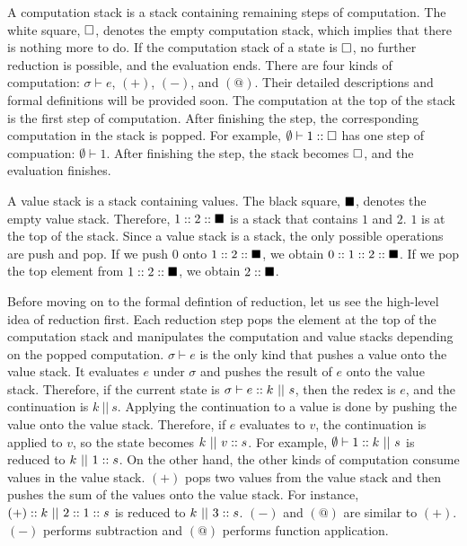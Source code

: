 A computation stack is a stack containing remaining steps of computation.
The white square, $\square$, denotes the empty computation stack, which
implies that there is nothing more to do. If the computation stack of a state is
$\square$, no further reduction is possible, and the evaluation ends.
There are four kinds of computation: $\sigma\vdash e$, $(+)$, $(-)$, and $(@)$.
Their detailed descriptions and formal definitions will be provided soon.
The computation at the top of the stack is the first step of computation. After
finishing the step, the corresponding computation in the stack is popped.
For example, $\emptyset\vdash1::\square$ has one step of compuation:
$\emptyset\vdash1$. After finishing the step, the stack becomes $\square$, and the
evaluation finishes.

A value stack is a stack containing values. The black square, $\blacksquare$, denotes the empty
value stack. Therefore, $1::2::\blacksquare$ is a stack that contains $1$
and $2$. $1$ is at the top of the stack. Since a value stack is a stack, the
only possible operations are push and pop. If we push $0$ onto
$1::2::\blacksquare$, we obtain $0::1::2::\blacksquare$.
If we pop the top element from $1::2::\blacksquare$, we obtain
$2::\blacksquare$.

Before moving on to the formal defintion of reduction, let us see the high-level
idea of reduction first.
Each reduction step pops the element at the top of the computation stack and
manipulates the computation and value stacks depending on the popped computation.
$\sigma\vdash e$ is the only kind that pushes a value onto the value stack.
It evaluates $e$ under $\sigma$ and pushes the result of $e$ onto the value stack.
Therefore, if the current state is $\sigma\vdash e::k\ ||\ s$, then the redex
is $e$, and the continuation is $k\ ||\ s$. Applying the continuation to a value is done by
pushing the value onto the value stack. Therefore, if $e$ evaluates to $v$, the
continuation is applied to $v$, so the state becomes $k\ ||\ \conss{v}s$.
For example, $\emptyset\vdash1::k\ ||\ s$ is reduced to $k\ ||\ 1::s$.
On the other hand, the other kinds of computation consume values in the value stack.
$(+)$ pops two values from the
value stack and then pushes the sum of the values onto the value stack.
For instance, $(+):: k\ ||\ 2::1::s$ is reduced to $k\ ||\ 3::s$.
$(-)$ and $(@)$ are similar to $(+)$. $(-)$ performs subtraction and $(@)$
performs function application.

